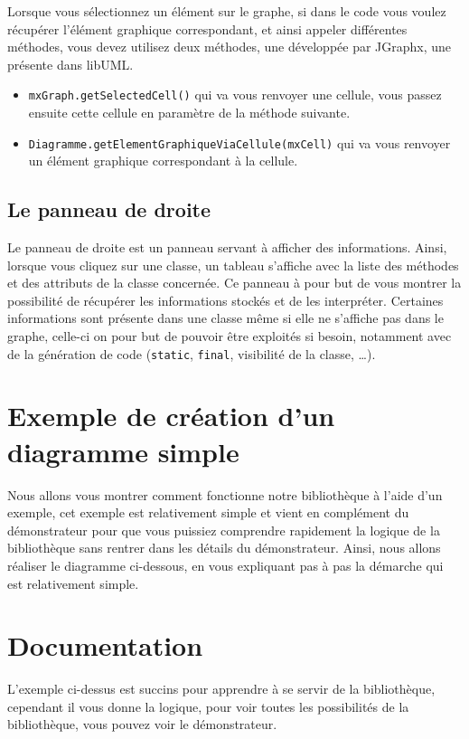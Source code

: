 \documentclass[12pt,a4paper,openany]{report}
\begin{document}
	Lorsque vous sélectionnez un élément sur le graphe, si dans le code vous voulez récupérer l'élément graphique correspondant, 
	et ainsi appeler différentes méthodes, vous devez utilisez deux méthodes, une développée par JGraphx, une présente dans libUML. 
	\begin{itemize}
		\item \texttt{mxGraph.getSelectedCell()} qui va vous renvoyer une cellule, vous passez ensuite cette cellule en paramètre de la méthode suivante.
		\item \texttt{Diagramme.getElementGraphiqueViaCellule(mxCell)} qui va vous renvoyer un élément graphique correspondant à la cellule.
	\end{itemize}
	
	\subsection{Le panneau de droite}
		Le panneau de droite est un panneau servant à afficher des informations. Ainsi, lorsque vous cliquez sur une classe, un tableau s'affiche
		avec la liste des méthodes et des attributs de la classe concernée. Ce panneau à pour but de vous montrer la possibilité
		de récupérer les informations stockés et de les interpréter. Certaines informations sont présente dans une classe même
		si elle ne s'affiche pas dans le graphe, celle-ci on pour but de pouvoir être exploités si besoin, notamment avec de la génération
		de code (\texttt{static}, \texttt{final}, visibilité de la classe, \ldots).
	\section{Exemple de création d'un diagramme simple}
		Nous allons vous montrer comment fonctionne notre bibliothèque à l'aide d'un exemple, cet exemple est relativement simple
		et vient en complément du démonstrateur pour que vous puissiez comprendre rapidement la logique de la bibliothèque sans rentrer dans les détails
		du démonstrateur. Ainsi, nous allons réaliser le diagramme ci-dessous, en vous expliquant pas à pas la démarche qui est relativement simple.
		
	\section{Documentation}
		L'exemple ci-dessus est succins pour apprendre à se servir de la bibliothèque, cependant il vous donne la logique, pour voir toutes les possibilités
		de la bibliothèque, vous pouvez voir le démonstrateur. 
\end{document}
